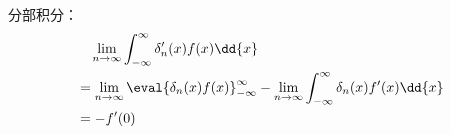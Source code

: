 
\begin{issues}
\issueDraft
\end{issues}


分部积分：
\begin{equation}
\begin{aligned}
&\quad \lim_{n\to\infty}\int_{-\infty}^\infty \delta'_n(x) f(x) \dd{x}\\
&= \lim_{n\to\infty}\eval{\delta_n(x) f(x)}_{-\infty}^\infty - \lim_{n\to\infty}\int_{-\infty}^\infty \delta_n(x) f'(x) \dd{x}\\
&= - f'(0)
\end{aligned}
\end{equation}

